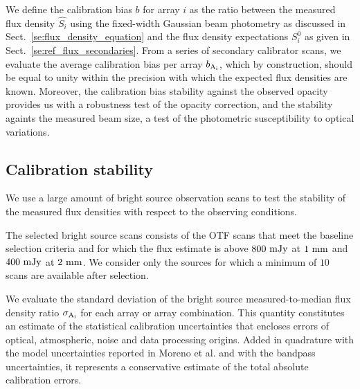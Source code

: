 We define the calibration bias $b$ for array $i$ as
the ratio between the measured flux density $\hat{S_{i}}$ using the
fixed-width Gaussian beam photometry as discussed in
Sect.~\ref{se:flux_density_equation} and the flux density expectations $S^{0}_{i}$ as
given in Sect.~\ref{se:ref_flux_secondaries}. From a series of
secondary calibrator scans, we evaluate the average calibration bias
per array $b_{\rm A_i}$, which by construction, should be equal to
unity within the precision with which the expected flux densities are
known. Moreover, the calibration bias stability against the observed
opacity provides us with a robustness test of the opacity correction,
and the stability againts the measured beam size, a test of the
photometric susceptibility to optical variations.

\subsection{Calibration stability}

We use a large amount of bright source observation scans to test the
stability of the measured flux densities with respect to the observing
conditions.

The selected bright source scans consists of the OTF scans that meet
the baseline selection criteria and for which the flux estimate is
above $800~\rm{mJy}$ at $1~\rm{mm}$ and $400~\rm{mJy}$ at
$2~\rm{mm}$. We consider only the sources for which a minimum of $10$
scans are available after selection.  

We evaluate the standard deviation of the bright source measured-to-median flux
density ratio $\sigma_{\rm A_i}$ for each array or array combination. 
This quantity constitutes an estimate of the statistical calibration
uncertainties that encloses errors of optical, atmospheric, noise and
data processing origins.
Added in quadrature with the model uncertainties reported in
Moreno et al. and with the bandpass uncertainties, it represents a
conservative estimate of the total absolute calibration errors.
